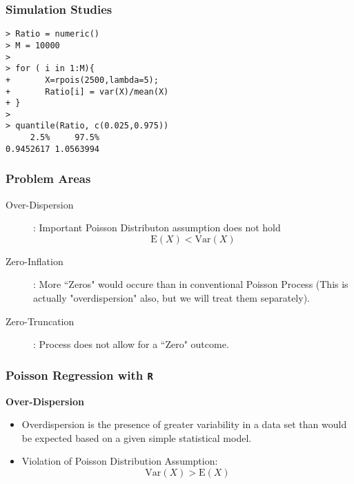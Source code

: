 \documentclass[MASTER.tex]{subfiles}
\begin{document}
\begin{frame}[fragile]
\frametitle{Simulation Studies}
\large
	\begin{framed}
		\begin{verbatim}
> Ratio = numeric()
> M = 10000
> 
> for ( i in 1:M){
+       X=rpois(2500,lambda=5);
+       Ratio[i] = var(X)/mean(X)
+ }
> 
> quantile(Ratio, c(0.025,0.975))
     2.5%     97.5% 
0.9452617 1.0563994 

		\end{verbatim}
	\end{framed}
\end{frame}



\begin{frame}
\frametitle{Problem Areas}
\Large
\begin{description}
\item[Over-Dispersion] : Important Poisson Distributon assumption does not hold 
\[ \mathrm{E}(X)  < \mathrm{Var}(X) \]
\item[Zero-Inflation] : More ``Zeros" would occure than in conventional Poisson Process (This is actually "overdispersion" also, but we will treat them separately). \smallskip
\item[ Zero-Truncation] : Process does not allow for a ``Zero" outcome. 
\end{description}
\end{frame}

\begin{frame}[fragile]
	
	\frametitle{Poisson Regression with \texttt{R}}
	\Large
	\textbf{Over-Dispersion}\\ 
	\begin{itemize}
		\item Overdispersion is the presence of greater variability
		in a data set than would be expected based on a given simple statistical model.
		\item Violation of Poisson Distribution Assumption:
		\[ \mathrm{Var}(X) >  \mathrm{E}(X) \]
	\end{itemize}
\end{frame}
\end{document}
